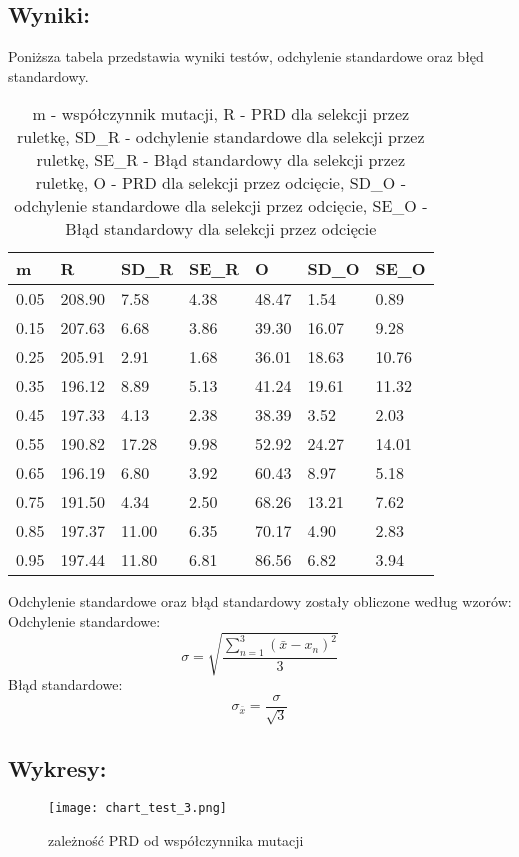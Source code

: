   \subsection{Wyniki: }
  Poniższa tabela przedstawia wyniki testów, odchylenie standardowe oraz błęd standardowy.
  \begin{table}[!ht]
    \centering
    \begin{tabular}{|l|l|l|l|l|l|l|}
    \hline
        m & R & SD_R & SE_R & O & SD_O & SE_O \\ \hline
        0.05 & 208.90 & 7.58 & 4.38 & 48.47 & 1.54 & 0.89 \\ \hline
        0.15 & 207.63 & 6.68 & 3.86 & 39.30 & 16.07 & 9.28 \\ \hline
        0.25 & 205.91 & 2.91 & 1.68 & 36.01 & 18.63 & 10.76 \\ \hline
        0.35 & 196.12 & 8.89 & 5.13 & 41.24 & 19.61 & 11.32 \\ \hline
        0.45 & 197.33 & 4.13 & 2.38 & 38.39 & 3.52 & 2.03 \\ \hline
        0.55 & 190.82 & 17.28 & 9.98 & 52.92 & 24.27 & 14.01 \\ \hline
        0.65 & 196.19 & 6.80 & 3.92 & 60.43 & 8.97 & 5.18 \\ \hline
        0.75 & 191.50 & 4.34 & 2.50 & 68.26 & 13.21 & 7.62 \\ \hline
        0.85 & 197.37 & 11.00 & 6.35 & 70.17 & 4.90 & 2.83 \\ \hline
        0.95 & 197.44 & 11.80 & 6.81 & 86.56 & 6.82 & 3.94 \\ \hline
    \end{tabular}
    \caption{m - współczynnik mutacji, R - PRD dla selekcji przez ruletkę, SD_R - odchylenie standardowe dla selekcji przez ruletkę, SE_R - Błąd standardowy dla selekcji przez ruletkę, O - PRD dla selekcji przez odcięcie, SD_O - odchylenie standardowe dla selekcji przez odcięcie, SE_O - Błąd standardowy dla selekcji przez odcięcie}

  \end{table}
    Odchylenie standardowe oraz błąd standardowy zostały obliczone według wzorów: \\
    Odchylenie standardowe:
    \[ \sigma = \sqrt{\frac{\sum_{n = 1}^{3}(\bar{x} - x_n)^2}{3}} \]
    Błąd standardowe:
    \[ \sigma_{\bar{x}} = \frac{\sigma}{\sqrt{3}} \]

  \subsection{Wykresy: }
    \begin{figure}[H]
      \texttt{[image: chart\_test\_3.png]}
      \centering
      \caption{zależność PRD od współczynnika mutacji}
    \end{figure}
  
